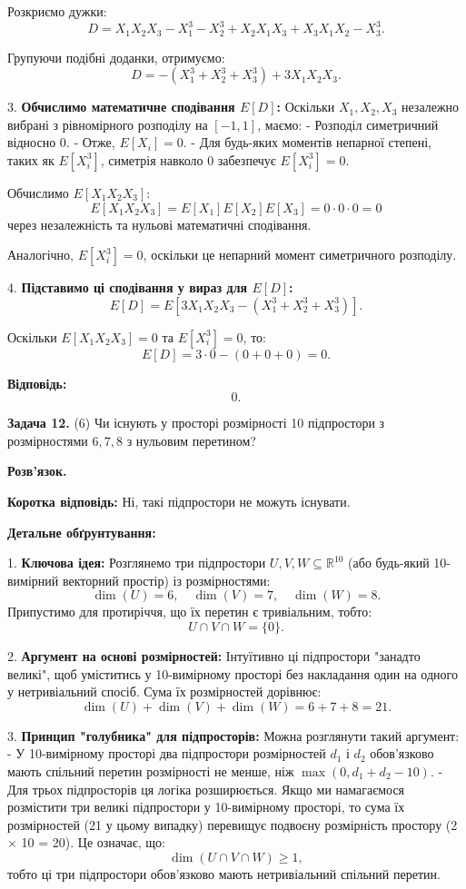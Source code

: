 \documentclass{article}
\begin{document}
   Розкриємо дужки:
   \[
   D = X_1X_2X_3 - X_1^3 - X_2^3 + X_2X_1X_3 + X_3X_1X_2 - X_3^3.
   \]

   Групуючи подібні доданки, отримуємо:
   \[
   D = - (X_1^3 + X_2^3 + X_3^3) + 3X_1X_2X_3.
   \]

3. \textbf{Обчислимо математичне сподівання \(E[D]\):}  
   Оскільки \(X_1, X_2, X_3\) незалежно вибрані з рівномірного розподілу на \([-1,1]\), маємо:
   - Розподіл симетричний відносно 0.
   - Отже, \(E[X_i] = 0\).
   - Для будь-яких моментів непарної степені, таких як \(E[X_i^3]\), симетрія навколо 0 забезпечує \(E[X_i^3] = 0\).

   Обчислимо \(E[X_1X_2X_3]\):
   \[
   E[X_1X_2X_3] = E[X_1]E[X_2]E[X_3] = 0 \cdot 0 \cdot 0 = 0
   \]
   через незалежність та нульові математичні сподівання.

   Аналогічно, \(E[X_i^3] = 0\), оскільки це непарний момент симетричного розподілу.

4. \textbf{Підставимо ці сподівання у вираз для \(E[D]\):}  
   \[
   E[D] = E[3X_1X_2X_3 - (X_1^3 + X_2^3 + X_3^3)].
   \]

   Оскільки \(E[X_1X_2X_3]=0\) та \(E[X_i^3]=0\), то:
   \[
   E[D] = 3 \cdot 0 - (0 + 0 + 0) = 0.
   \]

\textbf{Відповідь:}
\[
\boxed{0}.
\]

\bigskip

\noindent\textbf{Задача 12.} (6) Чи існують у просторі розмірності 10 підпростори з розмірностями \(6, 7, 8\) з нульовим перетином?

\textbf{Розв’язок.} 

\textbf{Коротка відповідь:} Ні, такі підпростори не можуть існувати.

\textbf{Детальне обґрунтування:}

1. \textbf{Ключова ідея:}  
   Розглянемо три підпростори \(U, V, W \subseteq \mathbb{R}^{10}\) (або будь-який 10-вимірний векторний простір) із розмірностями:
   \[
   \dim(U) = 6,\quad \dim(V) = 7,\quad \dim(W) = 8.
   \]
   Припустимо для протиріччя, що їх перетин є тривіальним, тобто:
   \[
   U \cap V \cap W = \{0\}.
   \]

2. \textbf{Аргумент на основі розмірностей:}  
   Інтуїтивно ці підпростори "занадто великі", щоб уміститись у 10-вимірному просторі без накладання один на одного у нетривіальний спосіб. Сума їх розмірностей дорівнює:
   \[
   \dim(U) + \dim(V) + \dim(W) = 6 + 7 + 8 = 21.
   \]

3. \textbf{Принцип "голубника" для підпросторів:}  
   Можна розглянути такий аргумент:
   - У 10-вимірному просторі два підпростори розмірностей \(d_1\) і \(d_2\) обов’язково мають спільний перетин розмірності не менше, ніж \(\max(0, d_1 + d_2 - 10)\).
   - Для трьох підпросторів ця логіка розширюється. Якщо ми намагаємося розмістити три великі підпростори у 10-вимірному просторі, то сума їх розмірностей (21 у цьому випадку) перевищує подвоєну розмірність простору (2 × 10 = 20). Це означає, що:
     \[
     \dim(U \cap V \cap W) \geq 1,
     \]
     тобто ці три підпростори обов’язково мають нетривіальний спільний перетин.
\end{document}
